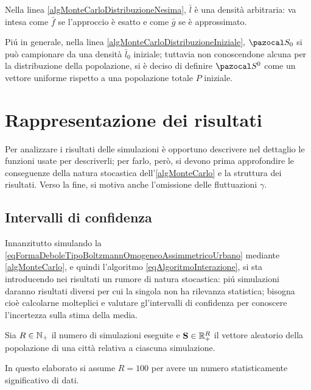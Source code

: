         \begin{oss}
            Nella linea \ref{algMonteCarloDistribuzioneNesima}, \(\bar l\) è una densità arbitraria: va intesa come \(\bar f\) se l'approccio è esatto e come \(\bar g\) se è approssimato.
        \end{oss}

        \begin{oss}
            Piú in generale, nella linea \ref{algMonteCarloDistribuzioneIniziale}, \(\pazocal S_0\) si può campionare da una densità \(\bar l_0\) iniziale; tuttavia non conoscendone alcuna per la distribuzione della popolazione, si è deciso di definire \(\pazocal S^0\) come un vettore uniforme rispetto a una popolazione totale \(P\) iniziale.
        \end{oss}

    \section{Rappresentazione dei risultati}

        Per analizzare i risultati delle simulazioni è opportuno descrivere nel dettaglio le funzioni usate per descriverli; per farlo, però, si devono prima approfondire le conseguenze della natura stocastica dell'\cref{algMonteCarlo} e la struttura dei risultati. Verso la fine, si motiva anche l'omissione delle fluttuazioni \(\gamma\).
        
        \subsection{Intervalli di confidenza}

            Innanzitutto simulando la \ref{eqFormaDeboleTipoBoltzmannOmogeneoAssimmetricoUrbano} mediante \cref{algMonteCarlo}, e quindi l'algoritmo \ref{eqAlgoritmoInterazione}, si sta introducendo nei risultati un rumore di natura stocastica: piú simulazioni daranno risultati diversi per cui la singola non ha rilevanza statistica; bisogna cioè calcolarne molteplici e valutare gl'intervalli di confidenza per conoscere l'incertezza sulla stima della media.

            Sia \(R\in\mathbb N_+\) il numero di simulazioni eseguite e \(\mathbf S\in\mathbb R_+^R\) il vettore aleatorio della popolazione di una città relativa a ciascuna simulazione.

            \begin{ipo}
                In questo elaborato si assume \(R=100\) per avere un numero statisticamente significativo di dati.
            \end{ipo}
           

